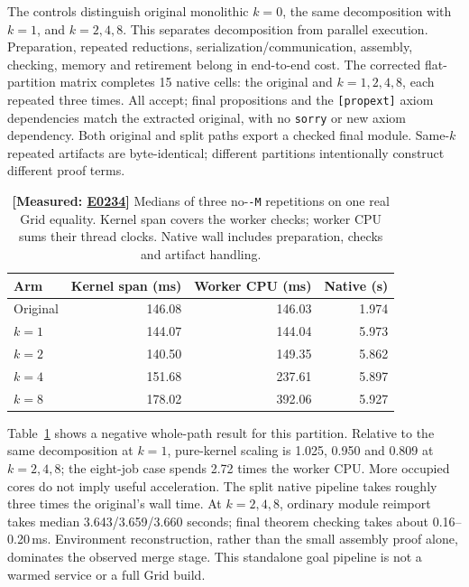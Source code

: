 \documentclass[10pt,twocolumn]{article}
\newcommand{\measured}[1]{\textbf{[Measured: #1]}}
\newcommand{\expref}[2]{\href{https://github.com/yunwei37/proofserve/blob/main/docs/tmp/build-and-evaluate/step-#1/step-report.md}{E#2}}
\begin{document}
The controls distinguish original monolithic $k=0$, the same decomposition
with $k=1$, and $k=2,4,8$.
This separates decomposition from parallel execution.
Preparation, repeated reductions, serialization/communication, assembly,
checking, memory and retirement belong in end-to-end cost.
The corrected flat-partition matrix completes 15 native cells:
the original and $k=1,2,4,8$, each repeated three times.
All accept; final propositions and the \texttt{[propext]} axiom dependencies
match the extracted original, with no \texttt{sorry} or new axiom dependency.
Both original and split paths export a checked final module.
Same-$k$ repeated artifacts are byte-identical; different partitions
intentionally construct different proof terms.

\begin{table}[t]
\centering\small\setlength{\tabcolsep}{3pt}
\begin{tabular}{lrrr}
\toprule
Arm & Kernel span (ms) & Worker CPU (ms) & Native (s)\\
\midrule
Original &146.08&146.03&1.974\\
$k=1$ &144.07&144.04&5.973\\
$k=2$ &140.50&149.35&5.862\\
$k=4$ &151.68&237.61&5.897\\
$k=8$ &178.02&392.06&5.927\\
\bottomrule
\end{tabular}
\caption{\measured{\expref{0234-20261101T030854+0000}{0234}} Medians of three no-\texttt{-M} repetitions on one real Grid
equality. Kernel span covers the worker checks; worker CPU sums their thread
clocks. Native wall includes preparation, checks and artifact handling.}
\label{tab:flat}
\end{table}

Table~\ref{tab:flat} shows a negative whole-path result for this partition.
Relative to the same decomposition at $k=1$, pure-kernel scaling is
1.025, 0.950 and 0.809 at $k=2,4,8$; the eight-job case spends 2.72 times
the worker CPU. More occupied cores do not imply useful acceleration.
The split native pipeline takes roughly three times the original's wall time.
At $k=2,4,8$, ordinary module reimport takes median
3.643/3.659/3.660 seconds; final theorem checking takes about 0.16--0.20\,ms.
Environment reconstruction, rather than the small assembly proof alone,
dominates the observed merge stage.
This standalone goal pipeline is not a warmed service or a full Grid build.
\end{document}
